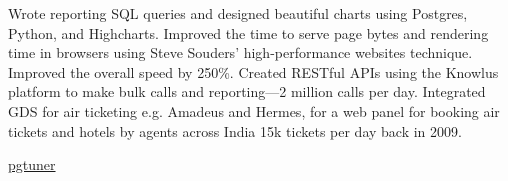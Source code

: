 \documentclass[10pt]{article} %
\begin{document}
\begin{paracol}{2}
{Wrote reporting SQL queries and designed beautiful charts using Postgres, Python, and Highcharts.}
{Improved the time to serve page bytes and rendering time in browsers using Steve Souders' high-performance websites technique. Improved the overall speed by 250\%.}
{Created RESTful APIs using the Knowlus platform to make bulk calls and reporting—2 million calls per day.}
{Integrated GDS for air ticketing e.g. Amadeus and Hermes, for a web panel for booking air tickets and hotels by agents across India 15k tickets per day back in 2009.}

 {\faGithub}\href{https://github.com/piyusgupta/pgtuner}{pgtuner}
\medskip %


\end{paracol}

\end{document}
